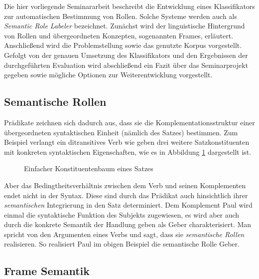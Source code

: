 \documentclass[12pt]{article}
\begin{document}
Die hier vorliegende Seminararbeit beschreibt die Entwicklung eines Klassifikators zur automatischen Bestimmung von Rollen. Solche Systeme werden auch als \textit{Semantic Role Labeler} bezeichnet.  Zunächst wird der linguistische Hintergrund von Rollen und übergeordneten Konzepten, sogenannten Frames, erläutert. Anschließend wird die Problemstellung sowie das genutzte Korpus vorgestellt. Gefolgt von der genauen Umsetzung des Klassifikators und den Ergebnissen der durchgeführten Evaluation wird abschließend ein Fazit über das Seminarprojekt gegeben sowie mögliche Optionen zur Weiterentwicklung vorgestellt. 

\subsection{Semantische Rollen}

Prädikate zeichnen sich dadurch aus, dass sie die Komplementationsstruktur einer
übergeordneten syntaktischen Einheit (nämlich des Satzes) bestimmen. Zum
Beispiel verlangt ein ditransitives Verb wie \glqq{}geben\grqq{} drei weitere Satzkonstituenten mit konkreten syntaktischen Eigenschaften, wie es in Abbildung \ref{Konstituentenbaum} dargestellt ist.

\begin{figure}[b]
	\centering
	\caption[Einfacher Konstituentenbaum]{Einfacher Konstituentenbaum eines Satzes}
	\label{Konstituentenbaum}
\end{figure}

Aber das Bedingtheitsverhältnis zwischen dem Verb und seinen Komplementen 
endet nicht in der Syntax. Diese sind durch das Prädikat auch hinsichtlich ihrer 
\textit{semantischen} Integrierung in den Satz determiniert. Dem Komplement \glqq{}Paul\grqq{}
wird einmal die syntaktische Funktion des Subjekts zugewiesen, es wird aber auch
durch die konkrete Semantik der Handlung \glqq{}geben\grqq{} als 
\glqq{}Geber\grqq{} charakterisiert. Man spricht von den Argumenten
eines Verbs und sagt, dass sie \textit{semantische Rollen} realisieren. So realisiert \glqq{}Paul\grqq{} im obigen Beispiel die semantische Rolle \glqq{}Geber\grqq{}.

\subsection{Frame Semantik}
\end{document}
